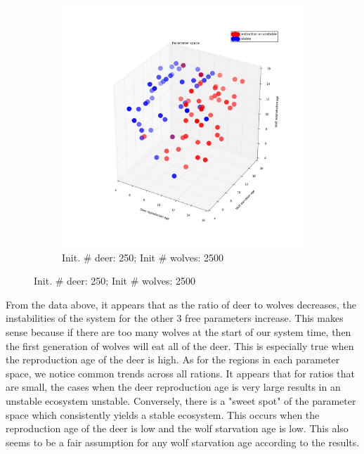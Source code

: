\documentclass[a4paper,12pt]{article}
\begin{document}
  \begin{figure}[ht]
  \centering
                \begin{subfigure}[t]{.45\linewidth}
                \includegraphics[width = 1\linewidth]{./pics/Restricted_Parameter_space_d250_w2500.png}
                \caption{Init. $\#$ deer: 250; Init $\#$ wolves: 2500}
                \end{subfigure}
        \label{RestrictParam}
  \end{figure}

From the data above, it appears that as the ratio of deer to wolves decreases, the instabilities of the system for the other 3 free parameters increase.  This
makes sense because if there are too many wolves at the start of our system time, then the first generation of wolves will eat all of the deer. This is especially
true when the reproduction age of the deer is high.  As for the regions in each parameter space, we notice common trends across all rations.  It appears that for 
ratios that are small, the cases when the deer reproduction age is very large results in an unstable ecosystem unstable.  Conversely, there is a "sweet spot" 
of the parameter space which consistently yields a stable ecosystem.  This occurs when the reproduction age of the deer is low and the wolf starvation age is low.  
This also seems to be a fair assumption for any wolf starvation age according to the results.  
\end{document}
